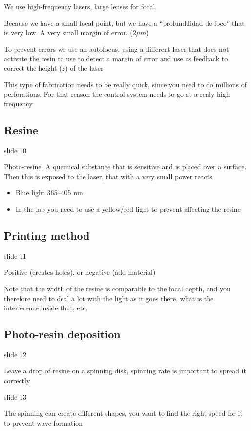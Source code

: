 \documentclass[../main/main.tex]{subfiles}
\begin{document}
We use high-frequency lasers,  large lenses for focal,

Because we have a small focal point, but we have a ``profunddidad de foco'' that is very low. A very small margin of error. ($2\mu m$)

To prevent errors we use an autofocus, using a different laser that does not activate the resin to use to detect a margin of error and use as feedback to correct the height ($z$) of the laser

This type of fabrication needs to be really quick, since you need to do millions of perforations. For that reason the control system needs to go at a realy high frequency


\subsection{Resine}

slide 10

Photo-resine. A quemical substance that is sensitive and is placed over a surface. Then this is exposed to the laser, that with a very small power reacts

\begin{itemize}
	\item Blue light 365--405 nm.
	\item In the lab you need to use a yellow/red light to prevent affecting the resine
\end{itemize}

\subsection{Printing method}
slide 11

Positive (creates holes), or negative (add material)

Note that the width of the resine is comparable to the focal depth, and you therefore need to deal a lot with the light as it goes there, what is the interference inside that, etc.

\subsection{Photo-resin deposition}

slide 12

Leave a drop of resine on a spinning disk, spinning rate is important to spread it correctly

slide 13

The spinning can create different shapes, you want to find the right speed for it to prevent wave formation
\end{document}
